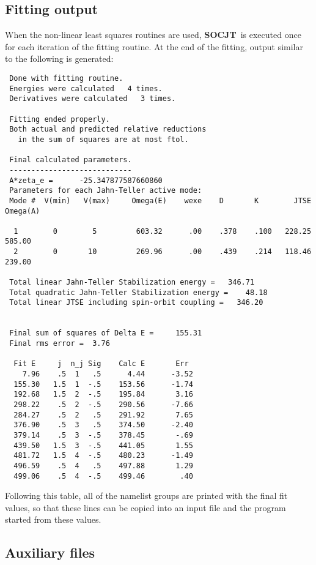 \documentclass{article}
\newcommand{\socjt}{{\bf SOCJT}}
\begin{document}
\subsection{Fitting output}

When the non-linear least squares routines are used, \socjt\ is
executed once for each iteration of the fitting routine. At the end of
the fitting, output similar to the following is generated:
\begin{verbatim}
 Done with fitting routine.
 Energies were calculated   4 times.
 Derivatives were calculated   3 times.
 
 Fitting ended properly.
 Both actual and predicted relative reductions
   in the sum of squares are at most ftol.
 
 Final calculated parameters.
 ----------------------------
 A*zeta_e =      -25.347877587660860
 Parameters for each Jahn-Teller active mode:
 Mode #  V(min)   V(max)     Omega(E)    wexe    D       K        JTSE  Omega(A)
 
  1        0        5         603.32      .00    .378    .100   228.25    585.00
  2        0       10         269.96      .00    .439    .214   118.46    239.00
 
 Total linear Jahn-Teller Stabilization energy =   346.71
 Total quadratic Jahn-Teller Stabilization energy =    48.18
 Total linear JTSE including spin-orbit coupling =   346.20
 
 
 Final sum of squares of Delta E =     155.31
 Final rms error =  3.76
 
  Fit E     j  n_j Sig    Calc E       Err
    7.96    .5  1   .5      4.44      -3.52
  155.30   1.5  1  -.5    153.56      -1.74
  192.68   1.5  2  -.5    195.84       3.16
  298.22    .5  2  -.5    290.56      -7.66
  284.27    .5  2   .5    291.92       7.65
  376.90    .5  3   .5    374.50      -2.40
  379.14    .5  3  -.5    378.45       -.69
  439.50   1.5  3  -.5    441.05       1.55
  481.72   1.5  4  -.5    480.23      -1.49
  496.59    .5  4   .5    497.88       1.29
  499.06    .5  4  -.5    499.46        .40
\end{verbatim}

Following this table, all of the namelist groups are printed with the
final fit values, so that these lines can be copied into an input file
and the program started from these values.

\subsection{Auxiliary files} \label{section:outputaux}
\end{document}
